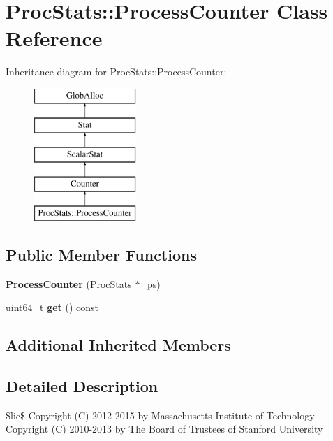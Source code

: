 \hypertarget{classProcStats_1_1ProcessCounter}{\section{Proc\-Stats\-:\-:Process\-Counter Class Reference}
\label{classProcStats_1_1ProcessCounter}
}
Inheritance diagram for Proc\-Stats\-:\-:Process\-Counter\-:\begin{figure}[H]
\begin{center}
\leavevmode
\includegraphics[height=5.000000cm]{classProcStats_1_1ProcessCounter}
\end{center}
\end{figure}
\subsection*{Public Member Functions}
\begin{DoxyCompactItemize}
\item 
\hypertarget{classProcStats_1_1ProcessCounter_a6db6f4ea589061f69c150b28bd6ddcde}{{\bfseries Process\-Counter} (\hyperlink{classProcStats}{Proc\-Stats} $\ast$\-\_\-ps)}\label{classProcStats_1_1ProcessCounter_a6db6f4ea589061f69c150b28bd6ddcde}

\item 
\hypertarget{classProcStats_1_1ProcessCounter_a52e07f80d1e0ae6000fe8a01f90d769d}{uint64\-\_\-t {\bfseries get} () const }\label{classProcStats_1_1ProcessCounter_a52e07f80d1e0ae6000fe8a01f90d769d}

\end{DoxyCompactItemize}
\subsection*{Additional Inherited Members}


\subsection{Detailed Description}
\$lic\$ Copyright (C) 2012-\/2015 by Massachusetts Institute of Technology Copyright (C) 2010-\/2013 by The Board of Trustees of Stanford University

